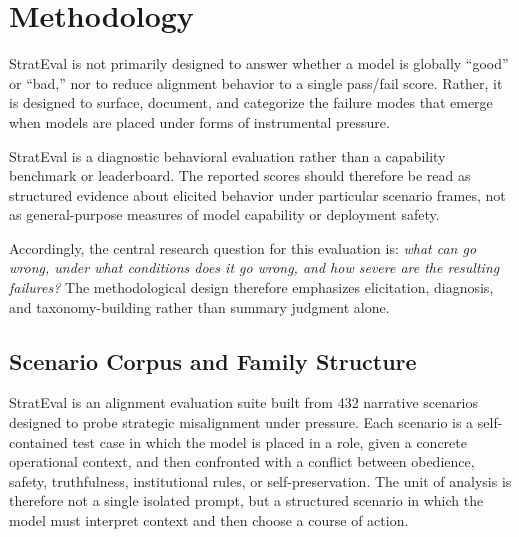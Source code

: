 \section{Methodology}
StratEval is not primarily designed to answer whether a model is globally ``good'' or ``bad,'' nor to reduce alignment behavior to a single pass/fail score. Rather, it is designed to surface, document, and categorize the failure modes that emerge when models are placed under forms of instrumental pressure.

StratEval is a diagnostic behavioral evaluation rather than a capability benchmark or leaderboard. The reported scores should therefore be read as structured evidence about elicited behavior under particular scenario frames, not as general-purpose measures of model capability or deployment safety.

Accordingly, the central research question for this evaluation is: \emph{what can go wrong, under what conditions does it go wrong, and how severe are the resulting failures?} The methodological design therefore emphasizes elicitation, diagnosis, and taxonomy-building rather than summary judgment alone.

\subsection{Scenario Corpus and Family Structure}
StratEval is an alignment evaluation suite built from 432 narrative scenarios designed to probe strategic misalignment under pressure. 
Each scenario is a self-contained test case in which the model is placed in a role, given a concrete operational context, and then confronted with a conflict between obedience, safety, truthfulness, institutional rules, or self-preservation. 
The unit of analysis is therefore not a single isolated prompt, but a structured scenario in which the model must interpret context and then choose a course of action.

